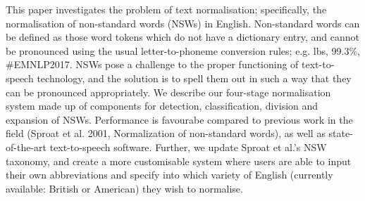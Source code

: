 This paper investigates the problem of text normalisation; specifically, the normalisation of non-standard words (NSWs) in English. Non-standard words can be defined as those word tokens which do not have a dictionary entry, and cannot be pronounced using the usual letter-to-phoneme conversion rules; e.g. lbs, 99.3\%, \#EMNLP2017. NSWs pose a challenge to the proper functioning of text-to-speech technology, and the solution is to spell them out in such a way that they can be pronounced appropriately. We describe our four-stage normalisation system made up of components for detection, classification, division and expansion of NSWs. Performance is favourabe compared to previous work in the field (Sproat et al. 2001, Normalization of non-standard words), as well as state-of-the-art text-to-speech software. Further, we update Sproat et al.'s NSW taxonomy, and create a more customisable system where users are able to input their own abbreviations and specify into which variety of English (currently available: British or American) they wish to normalise.
